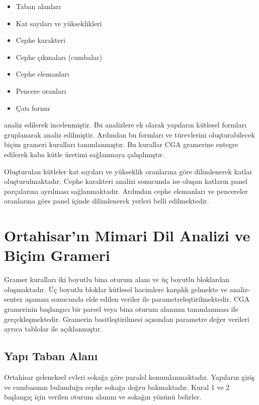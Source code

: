 \documentclass[12pt,turkish,a4paperpaper,]{report}
\providecommand{\tightlist}{%
  \setlength{\itemsep}{0pt}\setlength{\parskip}{0pt}}
\begin{document}
\begin{itemize}
\tightlist
\item
  Taban alanları
\item
  Kat sayıları ve yükseklikleri
\item
  Cephe karakteri
\item
  Cephe çıkmaları (cumbalar)
\item
  Cephe elemanları
\item
  Pencere oranları
\item
  Çatı formu
\end{itemize}

analiz edilerek incelenmiştir. Bu analizlere ek olarak yapıların
kütlesel formları gruplanarak analiz edilmiştir. Ardından bu formları ve
türevlerini oluşturabilecek biçim grameri kuralları tanımlanmıştır. Bu
kurallar CGA gramerine entegre edilerek kaba kütle üretimi sağlanmaya
çalışılmıştır.

Oluşturulan kütleler kat sayıları ve yükseklik oranlarına göre
dilimlenerek katlar oluşturulmaktadır. Cephe karakteri analizi sonucunda
ise oluşan katların panel parçalarına ayrılması sağlanmaktadır. Ardından
cephe elemanları ve pencereler oranlarına göre panel içinde dilimlenerek
yerleri belli edilmektedir.

\hypertarget{ortahisarux131n-mimari-dil-analizi-ve-biuxe7im-grameri}{%
\section{Ortahisar'ın Mimari Dil Analizi ve Biçim
Grameri}\label{ortahisarux131n-mimari-dil-analizi-ve-biuxe7im-grameri}}

Gramer kuralları iki boyutlu bina oturum alanı ve üç boyutlu bloklardan
oluşmaktadır. Üç boyutlu bloklar kütlesel hacimlere karşılık gelmekte ve
analiz-sentez aşaması sonucunda elde edilen veriler ile
parametreleştirilmektedir. CGA gramerinin başlangıcı bir parsel veya
bina oturum alanının tanımlanması ile gerçekleşmektedir. Gramerin
basitleştirilmesi açısından parametre değer verileri ayrıca tablolar ile
açıklanmıştır.

\hypertarget{yapux131-taban-alanux131}{%
\subsection{Yapı Taban Alanı}\label{yapux131-taban-alanux131}}

Ortahisar geleneksel evleri sokağa göre paralel konumlanmaktadır.
Yapıların giriş ve cumbasının bulunduğu cephe sokağa doğru bakmaktadır.
Kural 1 ve 2 başlangıç için verilen oturum alanını ve sokağın yönünü
belirler.
\end{document}
